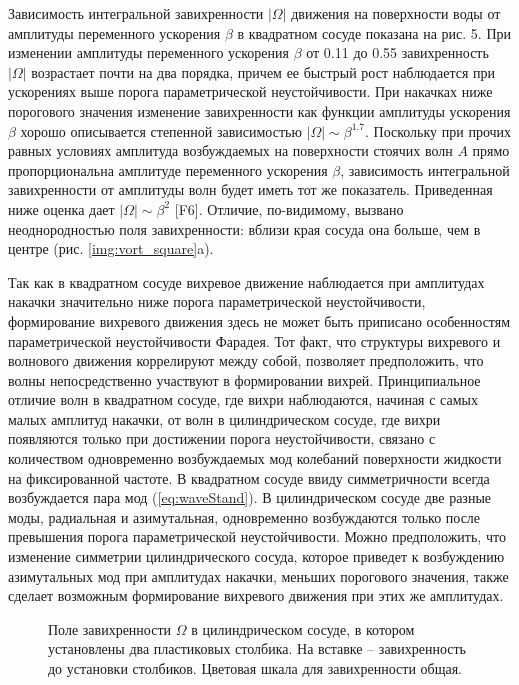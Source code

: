 Зависимость интегральной завихренности $|\Omega|$ движения на поверхности воды от амплитуды переменного ускорения $\beta$ в квадратном сосуде показана на рис. 5. При изменении амплитуды переменного ускорения $\beta$ от 0.11 до 0.55 завихренность $|\Omega|$ возрастает почти на два порядка, причем ее быстрый рост наблюдается при ускорениях выше порога параметрической неустойчивости. При накачках ниже порогового значения изменение завихренности как функции амплитуды ускорения $\beta$ хорошо описывается степенной зависимостью $|\Omega| \sim \beta^{1.7}$. Поскольку при прочих равных условиях амплитуда возбуждаемых на поверхности стоячих волн $A$ прямо пропорциональна амплитуде переменного ускорения $\beta$, зависимость интегральной завихренности от амплитуды волн будет иметь тот же показатель. Приведенная ниже оценка дает $|\Omega| \sim \beta^{2}$ [F6]. Отличие, по-видимому, вызвано неоднородностью поля завихренности: вблизи края сосуда она больше, чем в центре (рис. \ref{img:vort_square}a).

Так как в квадратном сосуде вихревое движение наблюдается при амплитудах накачки значительно ниже порога параметрической неустойчивости, формирование вихревого движения здесь не может быть приписано особенностям параметрической неустойчивости Фарадея. Тот факт, что структуры вихревого и волнового движения коррелируют между собой, позволяет предположить, что волны непосредственно участвуют в формировании вихрей. Принципиальное отличие волн в квадратном сосуде, где вихри наблюдаются, начиная с самых малых амплитуд накачки, от волн в цилиндрическом сосуде, где вихри появляются только при достижении порога неустойчивости, связано с количеством одновременно возбуждаемых мод колебаний поверхности жидкости на фиксированной частоте. В квадратном сосуде ввиду симметричности всегда возбуждается пара мод (\ref{eq:waveStand}). В цилиндрическом сосуде две разные моды, радиальная и азимутальная, одновременно возбуждаются только после превышения порога параметрической неустойчивости. Можно предположить, что изменение симметрии цилиндрического сосуда, которое приведет к возбуждению азимутальных мод при амплитудах накачки, меньших порогового значения, также сделает возможным формирование вихревого движения при этих же амплитудах.

\begin{figure}[ht]
  \begin{minipage}[ht]{0.49\linewidth}
  \end{minipage}
  \hfill
  \begin{minipage}[ht]{0.49\linewidth}
  \end{minipage}
  \caption{Поле завихренности $\Omega$ в цилиндрическом сосуде, в котором установлены два пластиковых столбика. На вставке – завихренность до установки столбиков. Цветовая шкала для завихренности общая.}
  \label{img:vort_st}  
\end{figure}

